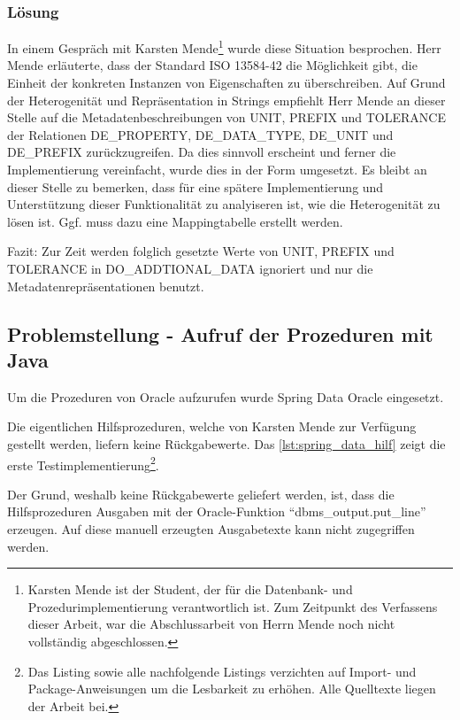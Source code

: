 \subsubsection{Lösung}

In einem Gespräch mit Karsten Mende\footnote{Karsten Mende ist der Student, der für die Datenbank- und Prozedurimplementierung verantwortlich ist. Zum Zeitpunkt des Verfassens dieser Arbeit, war die Abschlussarbeit von Herrn Mende noch nicht vollständig abgeschlossen.} wurde diese Situation besprochen. Herr Mende erläuterte, dass der Standard ISO 13584-42 \citep[vgl.][]{iso13584-42} die Möglichkeit gibt, die Einheit der konkreten Instanzen von Eigenschaften zu überschreiben. Auf Grund der Heterogenität und Repräsentation in Strings empfiehlt Herr Mende an dieser Stelle auf die Metadatenbeschreibungen von UNIT, PREFIX und TOLERANCE der Relationen DE\_PROPERTY, DE\_DATA\_TYPE, DE\_UNIT und DE\_PREFIX zurückzugreifen. 
Da dies sinnvoll erscheint und ferner die Implementierung vereinfacht, wurde dies in der Form umgesetzt. Es bleibt an dieser Stelle zu bemerken, dass für eine spätere Implementierung und Unterstützung dieser Funktionalität zu analyiseren ist, wie die Heterogenität zu lösen ist. Ggf. muss dazu eine Mappingtabelle erstellt werden.

Fazit:
Zur Zeit werden folglich gesetzte Werte von UNIT, PREFIX und TOLERANCE in DO\_ADDTIONAL\_DATA ignoriert und nur die Metadatenrepräsentationen benutzt.  

\subsection{Problemstellung - Aufruf der Prozeduren mit Java}
Um die Prozeduren von Oracle aufzurufen wurde Spring Data Oracle eingesetzt. 

Die eigentlichen Hilfsprozeduren, welche von Karsten Mende zur Verfügung gestellt werden, liefern keine Rückgabewerte. Das \autoref{lst:spring_data_hilf} zeigt die erste Testimplementierung\footnote{Das Listing sowie alle nachfolgende Listings verzichten auf Import- und Package-Anweisungen um die Lesbarkeit zu erhöhen. Alle Quelltexte liegen der Arbeit bei.}. 

Der Grund, weshalb keine Rückgabewerte geliefert werden, ist, dass die Hilfsprozeduren Ausgaben mit der Oracle-Funktion \enquote{dbms\_output.put\_line} erzeugen. Auf diese manuell erzeugten Ausgabetexte kann nicht zugegriffen werden. 

